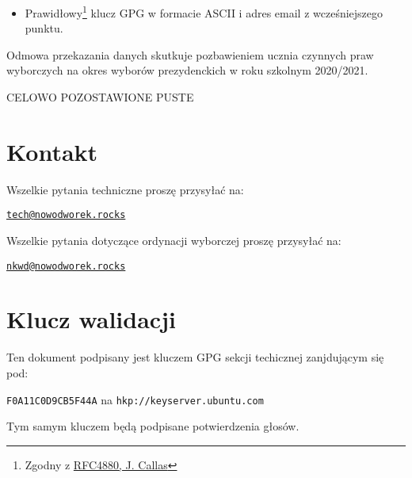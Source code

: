 \begin{itemize}
  \item Prawidłowy\footnote{Zgodny z \href{https://tools.ietf.org/html/rfc4880}{RFC4880, J. Callas}} klucz GPG w formacie ASCII i adres email z wcześniejszego punktu.
\end{itemize}
\vspace{0.3cm} %

Odmowa przekazania danych skutkuje pozbawieniem ucznia czynnych praw wyborczych na okres wyborów prezydenckich w roku szkolnym 2020/2021.

\vfill
\begin{center}
\normalsize \textcolor{white!30!black}{CELOWO POZOSTAWIONE PUSTE}\end{center}
\vfill

\newpage

\vspace{3cm}
\appendix
\section*{}

\section{Kontakt}

Wszelkie pytania techniczne proszę przysyłać na:
\begin{center}\href{mailto:tech@nowodworek.rocks}{\texttt{tech@nowodworek.rocks}}\end{center}
Wszelkie pytania dotyczące ordynacji wyborczej proszę przysyłać na:
\begin{center}\href{mailto:nkwd@nowodworek.rocks}{\texttt{nkwd@nowodworek.rocks}}\end{center}

\section{Klucz walidacji}

Ten dokument podpisany jest kluczem GPG sekcji techicznej zanjdującym się pod:
\begin{center}\texttt{F0A11C0D9CB5F44A} na \texttt{hkp://keyserver.ubuntu.com}\\ \end{center}
\noindent Tym samym kluczem będą podpisane potwierdzenia głosów.

